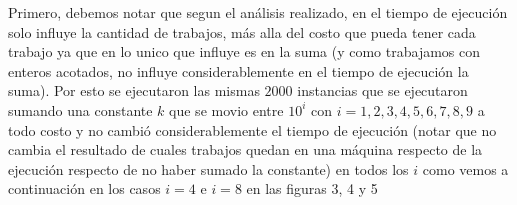 \documentclass[A4paper,oneside,fleqn,11pt]{article}
\theoremstyle{definition}
\begin{document}
Primero, debemos notar que segun el análisis realizado, en el tiempo de ejecución solo influye la cantidad de trabajos, más alla del costo que pueda tener cada trabajo ya que en lo unico que influye es en la suma (y como trabajamos con enteros acotados, no influye considerablemente en el tiempo de ejecución la suma). Por esto se ejecutaron las mismas $2000$ instancias que se ejecutaron sumando una constante $k$ que se movio entre $10^i$ con $i=1,2,3,4,5,6,7,8,9$ a todo costo y no cambió considerablemente el tiempo de ejecución (notar que no cambia el resultado de cuales trabajos quedan en una máquina respecto de la ejecución respecto de no haber sumado la constante) en todos los $i$ como vemos a continuación en los casos $i=4$ e $i=8$ en las figuras 3, 4 y 5

\vspace{5mm}
\end{document}
